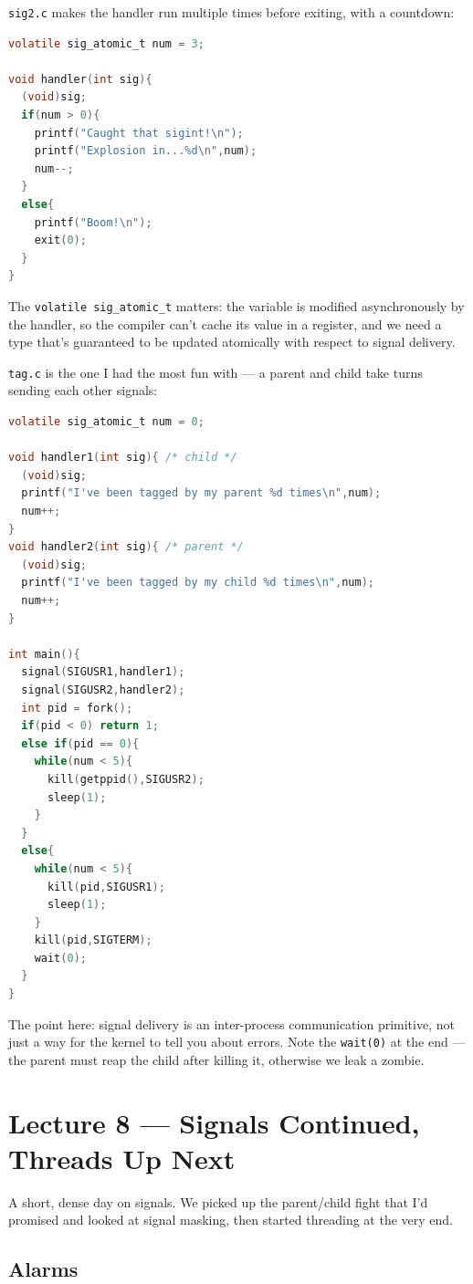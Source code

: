 \documentclass[11pt]{article}
\begin{document}
\texttt{sig2.c} makes the handler run multiple times before
exiting, with a countdown:

\begin{lstlisting}[language=C]
volatile sig_atomic_t num = 3;

void handler(int sig){
  (void)sig;
  if(num > 0){
    printf("Caught that sigint!\n");
    printf("Explosion in...%d\n",num);
    num--;
  }
  else{
    printf("Boom!\n");
    exit(0);
  }
}
\end{lstlisting}

The \texttt{volatile sig\_atomic\_t} matters: the variable is
modified asynchronously by the handler, so the compiler can't cache
its value in a register, and we need a type that's guaranteed to be
updated atomically with respect to signal delivery.

\texttt{tag.c} is the one I had the most fun with --- a parent and
child take turns sending each other signals:

\begin{lstlisting}[language=C]
volatile sig_atomic_t num = 0;

void handler1(int sig){ /* child */
  (void)sig;
  printf("I've been tagged by my parent %d times\n",num);
  num++;
}
void handler2(int sig){ /* parent */
  (void)sig;
  printf("I've been tagged by my child %d times\n",num);
  num++;
}

int main(){
  signal(SIGUSR1,handler1);
  signal(SIGUSR2,handler2);
  int pid = fork();
  if(pid < 0) return 1;
  else if(pid == 0){
    while(num < 5){
      kill(getppid(),SIGUSR2);
      sleep(1);
    }
  }
  else{
    while(num < 5){
      kill(pid,SIGUSR1);
      sleep(1);
    }
    kill(pid,SIGTERM);
    wait(0);
  }
}
\end{lstlisting}

The point here: signal delivery is an inter-process communication
primitive, not just a way for the kernel to tell you about errors.
Note the \texttt{wait(0)} at the end --- the parent must reap the
child after killing it, otherwise we leak a zombie.

\section{Lecture 8 --- Signals Continued, Threads Up Next}

A short, dense day on signals. We picked up the parent/child fight
that I'd promised and looked at signal masking, then started
threading at the very end.

\subsection*{Alarms}
\end{document}
